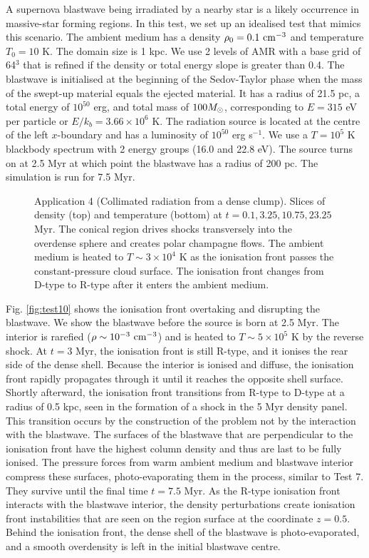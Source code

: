 \documentclass[useAMS,usenatbib]{mn2e}
\begin{document}
A supernova blastwave being irradiated by a nearby star is a likely
occurrence in massive-star forming regions.  In this test, we set up an
idealised test that mimics this scenario.  The ambient medium has a
density $\rho_0 = 0.1~\cubecm$ and temperature $T_0 = 10$ K.  The
domain size is 1 kpc.  We use 2 levels of AMR with a base grid of
64$^3$ that is refined if the density or total energy slope is greater
than 0.4.  The blastwave is initialised at the beginning of the
Sedov-Taylor phase when the mass of the swept-up material equals the
ejected material.  It has a radius of 21.5 pc, a total energy of
$10^{50}$ erg, and total mass of $100 \Ms$, corresponding to $E = 315$
eV per particle or $E/k_b = 3.66 \times 10^6$ K.  The radiation source
is located at the centre of the left $x$-boundary and has a luminosity
of $10^{50}$ erg s$^{-1}$.  We use a $T=10^5$ K blackbody spectrum
with 2 energy groups (16.0 and 22.8 eV).  The source turns on at 2.5
Myr at which point the blastwave has a radius of 200 pc.  The
simulation is run for 7.5 Myr.

\begin{figure*}
  \caption{\label{fig:test11} Application 4 (Collimated radiation from a
    dense clump).  Slices of density (top) and temperature (bottom) at
    $t = 0.1, 3.25, 10.75, 23.25$ Myr.  The conical \hii region
    drives shocks transversely into the overdense sphere and creates
    polar champagne flows.  The ambient medium is heated to $T \sim 3
    \times 10^4$ K as the ionisation front passes the
    constant-pressure cloud surface.  The ionisation front changes
    from D-type to R-type after it enters the ambient medium.}
\end{figure*}

Fig. \ref{fig:test10} shows the ionisation front overtaking and
disrupting the blastwave.  We show the blastwave before the source is
born at 2.5 Myr.  The interior is rarefied ($\rho \sim
10^{-3}~\cubecm$) and is heated to $T \sim 5 \times 10^5$ K by the
reverse shock.  At $t = 3$ Myr, the ionisation front is still R-type,
and it ionises the rear side of the dense shell.  Because the interior
is ionised and diffuse, the ionisation front rapidly propagates
through it until it reaches the opposite shell surface.  Shortly
afterward, the ionisation front transitions from R-type to D-type at a
radius of 0.5 kpc, seen in the formation of a shock in the 5 Myr
density panel.  This transition occurs by the construction of the
problem not by the interaction with the blastwave.  The surfaces of
the blastwave that are perpendicular to the ionisation front have the
highest column density and thus are last to be fully ionised.  The
pressure forces from warm ambient medium and blastwave interior
compress these surfaces, photo-evaporating them in the process,
similar to Test 7.  They survive until the final time $t = 7.5$ Myr.
As the R-type ionisation front interacts with the blastwave interior,
the density perturbations create ionisation front instabilities
\citep{Whalen08_Instab} that are seen on the \hii region surface
at the coordinate $z=0.5$.  Behind the ionisation front, the dense
shell of the blastwave is photo-evaporated, and a smooth overdensity
is left in the initial blastwave centre.
\end{document}

